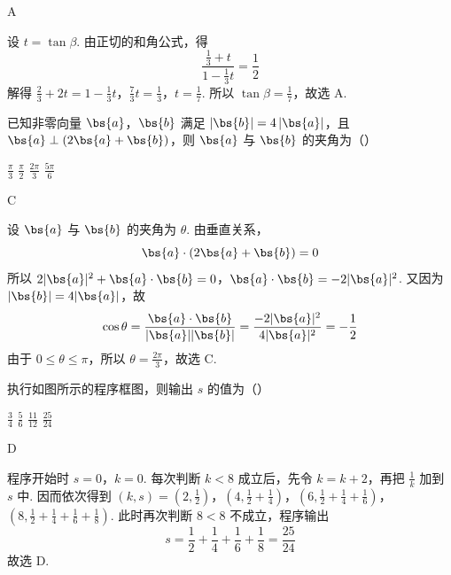 \begin{answer}
A
\end{answer}

\begin{solution}
设 \(t=\tan\beta\). 由正切的和角公式，得
\[
\frac{\frac13+t}{1-\frac13t}=\frac12
\]
解得
\(\frac23+2t=1-\frac13t\)，\(\frac73t=\frac13\)，\(t=\frac17\).
所以 \(\tan\beta=\frac17\)，故选 A.
\end{solution}

\begin{problem}
已知非零向量 \(\bs{a}\)，\(\bs{b}\) 满足 \(\left|\bs{b}\right| = 4\left|\bs{a}\right|\)，且 \(\bs{a} \perp (2\bs{a} + \bs{b})\)，则 \(\bs{a}\) 与 \(\bs{b}\) 的夹角为（\quad）

\choices
    {\(\frac{\pi}{3}\)}
    {\(\frac{\pi}{2}\)}
    {\(\frac{2\pi}{3}\)}
    {\(\frac{5\pi}{6}\)}
\end{problem}

\begin{answer}
C
\end{answer}

\begin{solution}
设 \(\bs{a}\) 与 \(\bs{b}\) 的夹角为 \(\theta\). 由垂直关系，
\[
\bs{a}\cdot(2\bs{a}+\bs{b})=0
\]
所以
\(2|\bs{a}|^{2}+\bs{a}\cdot\bs{b}=0\)，\(\bs{a}\cdot\bs{b}=-2|\bs{a}|^{2}\).
又因为 \(|\bs{b}|=4|\bs{a}|\)，故
\[
\cos\theta=\frac{\bs{a}\cdot\bs{b}}{|\bs{a}||\bs{b}|}
 =\frac{-2|\bs{a}|^{2}}{4|\bs{a}|^{2}}=-\frac12
\]
由于 \(0\leqslant\theta\leqslant\pi\)，所以 \(\theta=\frac{2\pi}{3}\)，故选 C.
\end{solution}

\begin{problem}
执行如图所示的程序框图，则输出 \(s\) 的值为（\quad）


\choices
    {\(\frac{3}{4}\)}
    {\(\frac{5}{6}\)}
    {\(\frac{11}{12}\)}
    {\(\frac{25}{24}\)}
\end{problem}

\begin{answer}
D
\end{answer}

\begin{solution}
程序开始时 \(s=0\)，\(k=0\). 每次判断 \(k<8\) 成立后，先令 \(k=k+2\)，再把 \(\frac{1}{k}\) 加到 \(s\) 中. 因而依次得到
\((k,s)=\left(2,\frac12\right)\)，\(\left(4,\frac12+\frac14\right)\)，\(\left(6,\frac12+\frac14+\frac16\right)\)，\(\left(8,\frac12+\frac14+\frac16+\frac18\right)\).
此时再次判断 \(8<8\) 不成立，程序输出
\[
s=\frac12+\frac14+\frac16+\frac18=\frac{25}{24}
\]
故选 D.
\end{solution}

